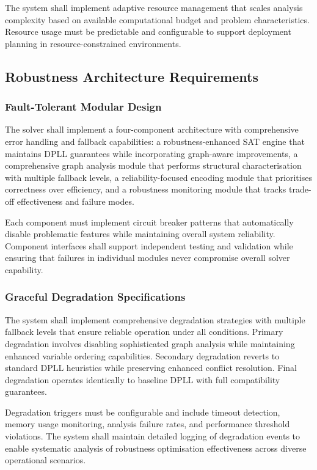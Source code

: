 The system shall implement adaptive resource management that scales analysis complexity based on available computational budget and problem characteristics. Resource usage must be predictable and configurable to support deployment planning in resource-constrained environments.

\subsection{Robustness Architecture Requirements}

\subsubsection{Fault-Tolerant Modular Design}
The solver shall implement a four-component architecture with comprehensive error handling and fallback capabilities: a robustness-enhanced SAT engine that maintains DPLL guarantees while incorporating graph-aware improvements, a comprehensive graph analysis module that performs structural characterisation with multiple fallback levels, a reliability-focused encoding module that prioritises correctness over efficiency, and a robustness monitoring module that tracks trade-off effectiveness and failure modes.

Each component must implement circuit breaker patterns that automatically disable problematic features while maintaining overall system reliability. Component interfaces shall support independent testing and validation while ensuring that failures in individual modules never compromise overall solver capability.

\subsubsection{Graceful Degradation Specifications}
The system shall implement comprehensive degradation strategies with multiple fallback levels that ensure reliable operation under all conditions. Primary degradation involves disabling sophisticated graph analysis while maintaining enhanced variable ordering capabilities. Secondary degradation reverts to standard DPLL heuristics while preserving enhanced conflict resolution. Final degradation operates identically to baseline DPLL with full compatibility guarantees.

Degradation triggers must be configurable and include timeout detection, memory usage monitoring, analysis failure rates, and performance threshold violations. The system shall maintain detailed logging of degradation events to enable systematic analysis of robustness optimisation effectiveness across diverse operational scenarios.

